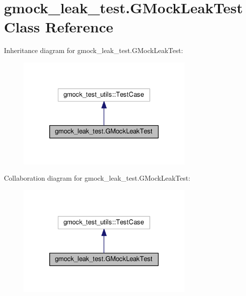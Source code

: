 \hypertarget{classgmock__leak__test_1_1GMockLeakTest}{}\section{gmock\+\_\+leak\+\_\+test.\+G\+Mock\+Leak\+Test Class Reference}
\label{classgmock__leak__test_1_1GMockLeakTest}


Inheritance diagram for gmock\+\_\+leak\+\_\+test.\+G\+Mock\+Leak\+Test\+:
\nopagebreak
\begin{figure}[H]
\begin{center}
\leavevmode
\includegraphics[width=246pt]{classgmock__leak__test_1_1GMockLeakTest__inherit__graph}
\end{center}
\end{figure}


Collaboration diagram for gmock\+\_\+leak\+\_\+test.\+G\+Mock\+Leak\+Test\+:
\nopagebreak
\begin{figure}[H]
\begin{center}
\leavevmode
\includegraphics[width=246pt]{classgmock__leak__test_1_1GMockLeakTest__coll__graph}
\end{center}
\end{figure}

